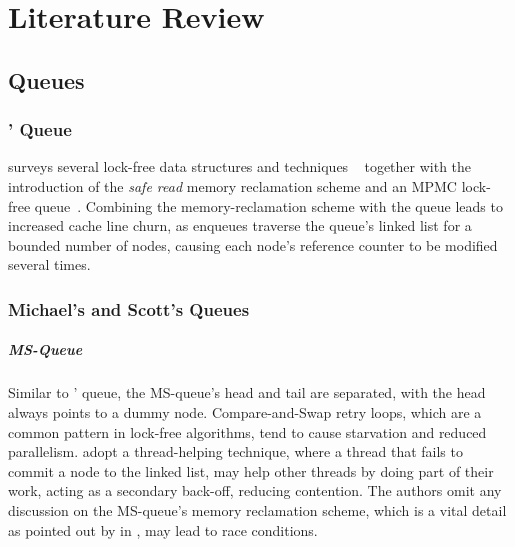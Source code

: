 \chapter{Literature Review}
\label{chap:lit_review}

\section{Queues}
\subsection{\citeauthor{valois1994queues}' Queue}

\citeauthor{valois1994queues} surveys several lock-free data structures and
techniques \textemdash~ together with the introduction of the \emph{safe read}
memory reclamation scheme and an MPMC lock-free
queue~\citep{valois1994queues,valois1995datastructures}.
Combining the memory-reclamation scheme with the queue leads to increased cache line
churn, as enqueues traverse the queue's linked list for a bounded number of
nodes, causing each node's reference counter to be modified several times. 


\subsection{Michael's and Scott's Queues}

\paragraph{MS-Queue}
Similar to \citeauthor{valois1994queues}' queue, the MS-queue's head and tail
are separated, with the head always points to a dummy node. Compare-and-Swap
retry loops, which are a common pattern in lock-free algorithms, tend to
cause starvation and reduced parallelism.
\citeauthor{michael1996simple} adopt a thread-helping technique, where a thread
that fails to commit a node to the linked list, may help other threads by doing
part of their work, acting as a secondary back-off, reducing contention. 
The authors omit any discussion on the MS-queue's memory reclamation scheme,
which is a vital detail as pointed out by \citeauthor{michael2004hazard}
in \citep{michael2004hazard}, may lead to race conditions. 

